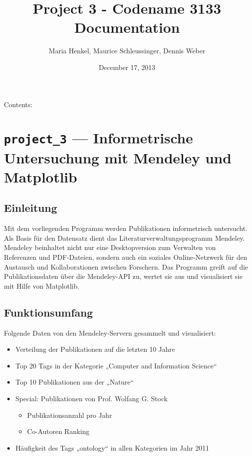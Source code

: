 \documentclass[letterpaper,10pt,english]{sphinxmanual}
\title{Project 3 - Codename 3133 Documentation}
\date{December 17, 2013}
\author{Maria Henkel, Maurice Schleussinger, Dennis Weber}
\begin{document}
\maketitle
\tableofcontents
{}\label{index::doc}


Contents:


\chapter{\texttt{project\_3} --- Informetrische Untersuchung mit Mendeley und Matplotlib}
\label{project_3:module-project_3}\label{project_3::doc}\label{project_3:project-3-informetrische-untersuchung-mit-mendeley-und-matplotlib}\label{project_3:welcome-to-project-3-codename-3133-s-documentation}

\section{Einleitung}
\label{project_3:einleitung}
Mit dem vorliegenden Programm werden Publikationen informetrisch untersucht. Als Basis für den Datensatz dient das Literaturverwaltungsprogramm Mendeley. Mendeley beinhaltet nicht nur eine Desktopversion zum Verwalten von Referenzen und PDF-Dateien, sondern auch ein soziales Online-Netzwerk für den Austausch und Kollaborationen zwischen Forschern. Das Programm greift auf die Publikationsdaten über die Mendeley-API zu, wertet sie aus und visualisiert sie mit Hilfe von Matplotlib.


\section{Funktionsumfang}
\label{project_3:funktionsumfang}
Folgende Daten von den Mendeley-Servern gesammelt und visualisiert:
\begin{itemize}
\item {} 
Verteilung der Publikationen auf die letzten 10 Jahre

\item {} 
Top 20 Tags in der Kategorie „Computer and Information Science“

\item {} 
Top 10 Publikationen aus der „Nature“

\item {} 
Special: Publikationen von Prof. Wolfang G. Stock
\begin{itemize}
\item {} 
Publikationsanzahl pro Jahr

\item {} 
Co-Autoren Ranking

\end{itemize}

\item {} 
Häufigkeit des Tags „ontology“ in allen Kategorien im Jahr 2011

\end{itemize}
\end{document}
